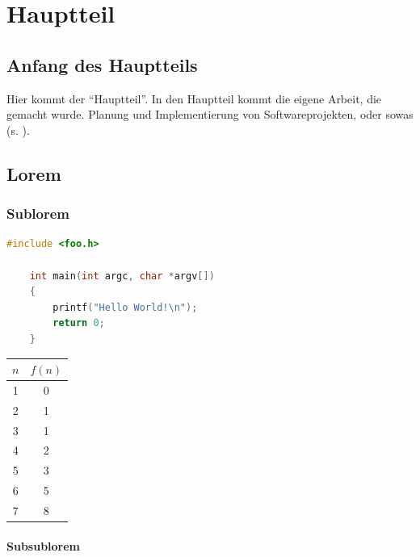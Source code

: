 \chapter{Hauptteil}

\section{Anfang des Hauptteils}

Hier kommt der "`Hauptteil"'.
In den Hauptteil kommt die eigene Arbeit, die gemacht wurde.
Planung und Implementierung von Softwareprojekten, oder sowas (s. \cite{knuth84}).

\section{Lorem}

\lipsum[1-3]

\subsection{Sublorem}

\begin{lstlisting}[language=c, style=dhpaperdefault]
    #include <foo.h>

    int main(int argc, char *argv[])
    {
        printf("Hello World!\n");
        return 0;
    }
\end{lstlisting}

\lipsum[2-3]

\begin{table}[h]
    \centering
    \begin{tabular}{c|c}
        $n$ & $f(n)$ \\ \hline
        1   & 0      \\
        2   & 1      \\
        3   & 1      \\
        4   & 2      \\
        5   & 3      \\
        6   & 5      \\
        7   & 8      \\
    \end{tabular}
\end{table}

\subsubsection{Subsublorem}

